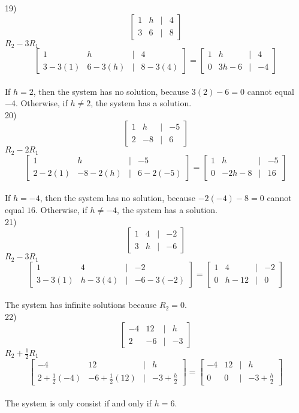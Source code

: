 \documentclass[]{article}
\begin{document}
19) \[
\begin{bmatrix}
	1 & h &|& 4\\
	3 & 6 &|& 8
\end{bmatrix}
\]
$R_2-3R_1$
\[
\begin{bmatrix}
	1&h&|&4\\
	3-3(1)&6-3(h)&|&8-3(4)
\end{bmatrix}=
\begin{bmatrix}
	1&h&|&4\\
	0&3h-6&|&-4
\end{bmatrix}
\]\\
If $h=2$, then the system has no solution, because $3(2)-6=0$ cannot equal $-4$. Otherwise, if $h\neq2$, the system has a solution.\\

20) \[
\begin{bmatrix}
	1&h&|&-5\\
	2&-8&|&6
\end{bmatrix}
\]
$R_2-2R_1$
\[
\begin{bmatrix}
	1&h&|&-5\\
	2-2(1)&-8-2(h)&|&6-2(-5)
\end{bmatrix}=
\begin{bmatrix}
	1&h&|&-5\\
	0&-2h-8&|&16
\end{bmatrix}
\]\\
If $h=-4$, then the system has no solution, because $-2(-4)-8=0$ cannot equal $16$. Otherwise, if $h\neq-4$, the system has a solution.\\

21) \[
\begin{bmatrix}
	1&4&|&-2\\
	3&h&|&-6
\end{bmatrix}
\]
$R_2-3R_1$
\[
\begin{bmatrix}
	1&4&|&-2\\
	3-3(1)&h-3(4)&|&-6-3(-2)
\end{bmatrix}=
\begin{bmatrix}
	1&4&|&-2\\
	0&h-12&|&0
\end{bmatrix}
\]\\
The system has infinite solutions because $R_2 = 0$.\\

22) \[
\begin{bmatrix}
	-4&12&|&h\\
	2&-6&|&-3
\end{bmatrix}
\]
$R_2+\frac{1}{2}R_1$
\[
\begin{bmatrix}
	-4&12&|&h\\
	2+\frac{1}{2}(-4)&-6+\frac{1}{2}(12)&|&-3+\frac{h}{2}
\end{bmatrix}=
\begin{bmatrix}
	-4&12&|&h\\
	0&0&|&-3+\frac{h}{2}
\end{bmatrix}
\]\\
The system is only consist if and only if $h=6$.\\
\end{document}
